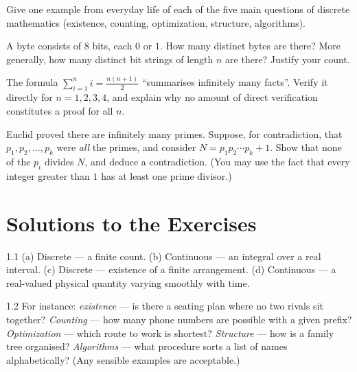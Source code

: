 \begin{exercise}{\easy}
Give one example from everyday life of each of the five main questions of
discrete mathematics (existence, counting, optimization, structure,
algorithms).
\end{exercise}

\begin{exercise}{\medium}
A byte consists of $8$ bits, each $0$ or $1$. How many distinct bytes are
there? More generally, how many distinct bit strings of length $n$ are there?
Justify your count.
\end{exercise}

\begin{exercise}{\medium}
The formula $\sum_{i=1}^{n} i = \frac{n(n+1)}{2}$ ``summarises infinitely many
facts''. Verify it directly for $n = 1, 2, 3, 4$, and explain why no amount of
direct verification constitutes a proof for all $n$.
\end{exercise}

\begin{exercise}{\hard}
Euclid proved there are infinitely many primes. Suppose, for contradiction,
that $p_1, p_2, \ldots, p_k$ were \emph{all} the primes, and consider
$N = p_1 p_2 \cdots p_k + 1$. Show that none of the $p_i$ divides $N$, and
deduce a contradiction. (You may use the fact that every integer greater than
$1$ has at least one prime divisor.)
\end{exercise}

\section*{Solutions to the Exercises}

\begin{solution}{1.1}
(a) Discrete --- a finite count. (b) Continuous --- an integral over a real
interval. (c) Discrete --- existence of a finite arrangement. (d) Continuous
--- a real-valued physical quantity varying smoothly with time.
\end{solution}

\begin{solution}{1.2}
For instance: \emph{existence} --- is there a seating plan where no two rivals
sit together? \emph{Counting} --- how many phone numbers are possible with a
given prefix? \emph{Optimization} --- which route to work is shortest?
\emph{Structure} --- how is a family tree organised? \emph{Algorithms} --- what
procedure sorts a list of names alphabetically? (Any sensible examples are
acceptable.)
\end{solution}

